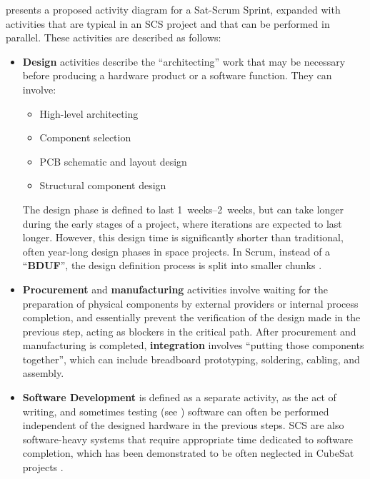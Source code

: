 \documentclass[a4paper,nobib,justified,final]{tufte-book}
\begin{document}
 presents a proposed activity diagram for a Sat-Scrum Sprint, expanded with activities that are typical in an \acs{SCS} project and that can be performed in parallel. These activities are described as follows:
\begin{itemize}[itemsep=-1ex]
	\item \textbf{Design} activities describe the ``architecting'' work that may be necessary before producing a hardware product or a software function. They can involve:
	\begin{itemize}[itemsep=-2ex]
		\item High-level architecting
		\item Component selection
		\item \acs{PCB} schematic and layout design
		\item Structural component design
	\end{itemize}
	
	The design phase is defined to last \qtyrange[range-units = single]{1}{2}{weeks}, but can take longer during the early stages of a project, where iterations are expected to last longer. However, this design time is significantly shorter than traditional, often year-long design phases in space projects. In Scrum, instead of a ``\textbf{\acf{BDUF}}'', the design definition process is split into smaller chunks \autocite{watermanHowMuchUpFront2015}.
	\item \textbf{Procurement} and \textbf{manufacturing} activities involve waiting for the preparation of physical components by external providers or internal process completion, and essentially prevent the verification of the design made in the previous step, acting as blockers in the critical path. After procurement and manufacturing is completed, \textbf{integration} involves ``putting those components together'', which can include breadboard prototyping, soldering, cabling, and assembly.
	\item \textbf{Software Development} is defined as a separate activity, as the act of writing, and sometimes testing (see ) software can often be performed independent of the designed hardware in the previous steps. \acs{SCS} are also software-heavy systems that require appropriate time dedicated to software completion, which has been demonstrated to be often neglected in CubeSat projects \autocite{sanchoLessonsLearnedFYS2021}.
	

\end{itemize}
\end{document}
